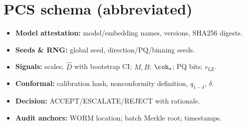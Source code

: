 \documentclass[11pt]{article}
\begin{document}
\section{PCS schema (abbreviated)}
\begin{itemize}
  \item \textbf{Model attestation:} model/embedding names, versions, SHA256 digests.
  \item \textbf{Seeds \& RNG:} global seed, direction/PQ/binning seeds.
  \item \textbf{Signals:} scales; $\hat D$ with bootstrap CI; $M,B$; $\coh_\star$; PQ bits; $r_{\mathrm{LZ}}$.
  \item \textbf{Conformal:} calibration hash, nonconformity definition, $q_{1-\delta}$, $\delta$.
  \item \textbf{Decision:} \textsc{ACCEPT}/\textsc{ESCALATE}/\textsc{REJECT} with rationale.
  \item \textbf{Audit anchors:} WORM location; batch Merkle root; timestamps.
\end{itemize}
\end{document}
